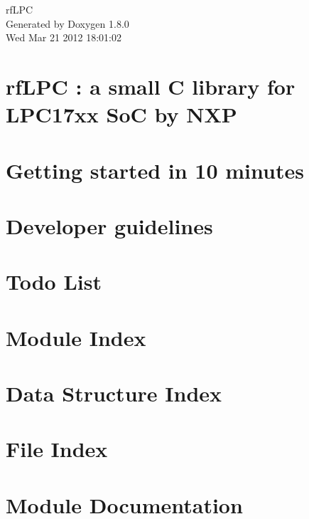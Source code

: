 \documentclass{book}
\begin{document}
\hypersetup{pageanchor=false,citecolor=blue}
\begin{titlepage}
\vspace*{7cm}
\begin{center}
{\Large rf\-L\-P\-C }\\
\vspace*{1cm}
{\large Generated by Doxygen 1.8.0}\\
\vspace*{0.5cm}
{\small Wed Mar 21 2012 18:01:02}\\
\end{center}
\end{titlepage}
\clearemptydoublepage
{}
\tableofcontents
\clearemptydoublepage
{}
\hypersetup{pageanchor=true,citecolor=blue}
\chapter{rf\-L\-P\-C \-: a small C library for L\-P\-C17xx So\-C by N\-X\-P}
\label{index}\hypertarget{index}{}
\chapter{Getting started in 10 minutes}
\label{start}
\hypertarget{start}{}

\chapter{Developer guidelines}
\label{guidelines}
\hypertarget{guidelines}{}

\chapter{Todo List}
\label{todo}
\hypertarget{todo}{}

\chapter{Module Index}

\chapter{Data Structure Index}

\chapter{File Index}

\chapter{Module Documentation}

















\end{document}
